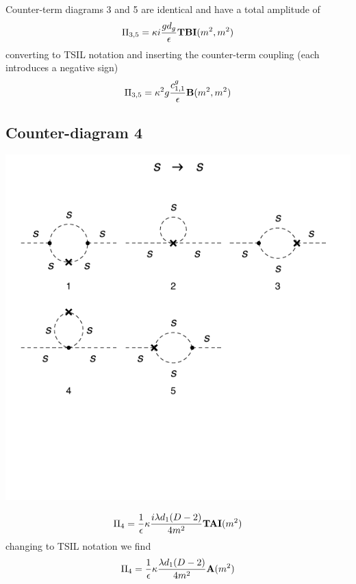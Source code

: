 \documentclass[11pt]{article}
\newcommand{\tsil}{\textsf{TSIL} \! }
\begin{document}
\noindent\begin{minipage}{0.7\textwidth}
Counter-term diagrams 3 and 5 are identical and have a total amplitude of
 \begin{align}
 \Pi_{3,5} = \kappa i \frac{g d_g}{\epsilon} {\tt{\mathbf{TBI}}}(m^2,m^2) 
 \end{align}
converting to TSIL notation and inserting the counter-term coupling (each introduces a negative sign)
\begin{align}
 \Pi_{3,5} = \kappa^2 g \frac{c_{1,1}^g}{\epsilon} {\tt{\mathbf{B}}}(m^2,m^2) 
 \end{align}
\end{minipage}
 
\subsection*{Counter-diagram 4}
\noindent\begin{minipage}{0.3\textwidth}
\begin{center}
\includegraphics{2loop_4c.pdf}
\end{center}
\end{minipage}
\noindent\begin{minipage}{0.7\textwidth}

 \begin{align}
 \Pi_4 =  \frac{ 1 }{\epsilon}\kappa \frac{i \lambda d_1 (D-2)}{ 4 m^2} {\tt{\mathbf{TAI}}}(m^2) 
 \end{align}
changing to \tsil notation we find
 \begin{align}
 \Pi_4 =  \frac{ 1 }{\epsilon}\kappa \frac{ \lambda d_1 (D-2)}{ 4 m^2} {\tt{\mathbf{A}}}(m^2) 
 \end{align}
 \end{minipage}
\end{document}
